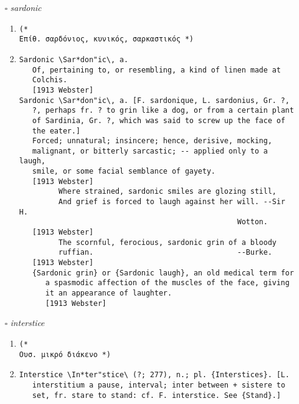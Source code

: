 \documentclass{article}
\begin{document}
\begin{itemize}
\begin{enumerate}
{\begin{lstlisting}
   {Trudging}.] [Perhaps of Scand. origin, and originally
   meaning, to walk on snowshoes; cf. dial. Sw. truga, trudja, a
   snowshoe, Norw. truga, Icel. [thorn]r[=u]ga.]
   To walk or march with labor; to jog along; to move wearily.
   [1913 Webster]
         And trudged to Rome upon my naked feet.  --Dryden.
   [1913 Webster]
\end{lstlisting}}
\end{enumerate}
\item[$\square$] \emph{ sardonic }
\begin{enumerate}
\item{
\begin{lstlisting}
(* 
Επίθ. σαρδόνιος, κυνικός, σαρκαστικός *)
\end{lstlisting}}
\item{
\begin{lstlisting}
Sardonic \Sar*don"ic\, a.
   Of, pertaining to, or resembling, a kind of linen made at
   Colchis.
   [1913 Webster]
Sardonic \Sar*don"ic\, a. [F. sardonique, L. sardonius, Gr. ?,
   ?, perhaps fr. ? to grin like a dog, or from a certain plant
   of Sardinia, Gr. ?, which was said to screw up the face of
   the eater.]
   Forced; unnatural; insincere; hence, derisive, mocking,
   malignant, or bitterly sarcastic; -- applied only to a laugh,
   smile, or some facial semblance of gayety.
   [1913 Webster]
         Where strained, sardonic smiles are glozing still,
         And grief is forced to laugh against her will. --Sir H.
                                                  Wotton.
   [1913 Webster]
         The scornful, ferocious, sardonic grin of a bloody
         ruffian.                                 --Burke.
   [1913 Webster]
   {Sardonic grin} or {Sardonic laugh}, an old medical term for
      a spasmodic affection of the muscles of the face, giving
      it an appearance of laughter.
      [1913 Webster]
\end{lstlisting}}
\end{enumerate}
\item[$\square$] \emph{ interstice }
\begin{enumerate}
\item{
\begin{lstlisting}
(* 
Ουσ. μικρό διάκενο *)
\end{lstlisting}}
\item{
\begin{lstlisting}
Interstice \In*ter"stice\ (?; 277), n.; pl. {Interstices}. [L.
   interstitium a pause, interval; inter between + sistere to
   set, fr. stare to stand: cf. F. interstice. See {Stand}.]

\end{lstlisting}}
\end{enumerate}
\end{itemize}
\end{document}
